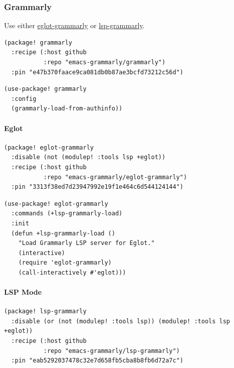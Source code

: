 \documentclass[11pt]{article}
\begin{document}
\subsubsection{Grammarly}
\label{sec:org2030daf}
Use either \href{https://github.com/emacs-grammarly/eglot-grammarly}{eglot-grammarly} or \href{https://github.com/emacs-grammarly/lsp-grammarly}{lsp-grammarly}.

\begin{verbatim}
(package! grammarly
  :recipe (:host github
           :repo "emacs-grammarly/grammarly")
  :pin "e47b370faace9ca081db0b87ae3bcfd73212c56d")
\end{verbatim}

\begin{verbatim}
(use-package! grammarly
  :config
  (grammarly-load-from-authinfo))
\end{verbatim}

\paragraph{Eglot}
\label{sec:orgcb14558}

\begin{verbatim}
(package! eglot-grammarly
  :disable (not (modulep! :tools lsp +eglot))
  :recipe (:host github
           :repo "emacs-grammarly/eglot-grammarly")
  :pin "3313f38ed7d23947992e19f1e464c6d544124144")
\end{verbatim}

\begin{verbatim}
(use-package! eglot-grammarly
  :commands (+lsp-grammarly-load)
  :init
  (defun +lsp-grammarly-load ()
    "Load Grammarly LSP server for Eglot."
    (interactive)
    (require 'eglot-grammarly)
    (call-interactively #'eglot)))
\end{verbatim}

\paragraph{LSP Mode}
\label{sec:org25e83b2}

\begin{verbatim}
(package! lsp-grammarly
  :disable (or (not (modulep! :tools lsp)) (modulep! :tools lsp +eglot))
  :recipe (:host github
           :repo "emacs-grammarly/lsp-grammarly")
  :pin "eab5292037478c32e7d658fb5cba8b8fb6d72a7c")
\end{verbatim}
\end{document}
